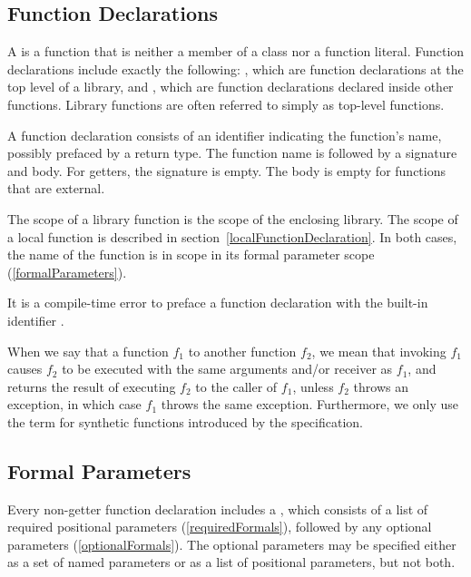 \documentclass[makeidx]{article}
\begin{document}
\subsection{Function Declarations}

\LMHash{}%
A  is a function that
is neither a member of a class nor a function literal.
Function declarations include exactly the following:
,
which are function declarations
at the top level of a library, and
,
which are function declarations declared inside other functions.
Library functions are often referred to simply as top-level functions.

\LMHash{}%
A function declaration consists of an identifier indicating the function's name,
possibly prefaced by a return type.
The function name is followed by a signature and body.
For getters, the signature is empty.
The body is empty for functions that are external.

\LMHash{}%
The scope of a library function is the scope of the enclosing library.
The scope of a local function is described
in section~\ref{localFunctionDeclaration}.
In both cases, the name of the function is in scope
in its formal parameter scope
(\ref{formalParameters}).

\LMHash{}%
It is a compile-time error to preface a function declaration
with the built-in identifier \STATIC.

\LMHash{}%
When we say that a function $f_1$  to another function $f_2$,
we mean that invoking $f_1$ causes $f_2$ to be executed
with the same arguments and/or receiver as $f_1$,
and returns the result of executing $f_2$ to the caller of $f_1$,
unless $f_2$ throws an exception,
in which case $f_1$ throws the same exception.
Furthermore, we only use the term for
synthetic functions introduced by the specification.


\subsection{Formal Parameters}

\LMHash{}%
Every non-getter function declaration includes a
,
which consists of a list of required positional parameters
(\ref{requiredFormals}),
followed by any optional parameters (\ref{optionalFormals}).
The optional parameters may be specified either as
a set of named parameters or as a list of positional parameters,
but not both.
\end{document}
